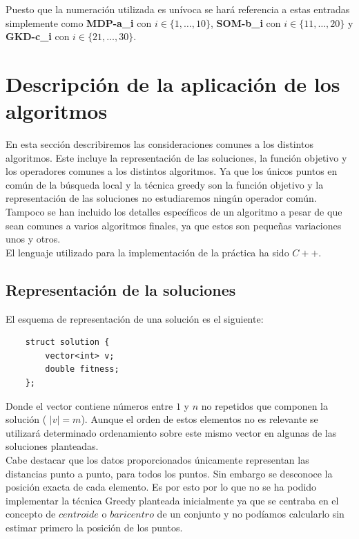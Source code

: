 \documentclass[11pt,a4paper]{article}
\begin{document}
	Puesto que la numeración utilizada es unívoca se hará referencia a estas entradas simplemente como \textbf{MDP-a\_i} con $i\in\{1,\dotsc,10\}$, \textbf{SOM-b\_i} con $i\in\{11,\dotsc,20\}$ y \textbf{GKD-c\_i} con $i\in\{21,\dotsc,30\}$.
	
	\section{Descripción de la aplicación de los algoritmos}
	
	En esta sección describiremos las consideraciones comunes a los distintos algoritmos. Este incluye la representación de las soluciones, la función objetivo y los operadores comunes a los distintos algoritmos. Ya que los únicos puntos en común de la búsqueda local y la técnica greedy son la función objetivo y la representación de las soluciones no estudiaremos ningún operador común. Tampoco se han incluido los detalles específicos de un algoritmo a pesar de que sean comunes a varios algoritmos finales, ya que estos son pequeñas variaciones unos y otros.  \\
	
	El lenguaje utilizado para la implementación de la práctica ha sido $C++$. 
	
	\subsection{Representación de la soluciones}
	
	El esquema de representación de una solución es el siguiente:

	\begin{lstlisting}
	struct solution {
		vector<int> v;
		double fitness;
	};
	\end{lstlisting}
	
	Donde el vector contiene números entre $1$ y $n$ no repetidos que componen la solución ( $|v| = m$). Aunque el orden de estos elementos no es relevante se utilizará determinado ordenamiento sobre este mismo vector en algunas de las soluciones planteadas. \\
	
	Cabe destacar que los datos proporcionados únicamente representan las distancias punto a punto, para todos los puntos. Sin embargo se desconoce la posición exacta de cada elemento. Es por esto por lo que no se ha podido implementar la técnica Greedy planteada inicialmente ya que se centraba en el concepto de $centroide$ o $baricentro$ de un conjunto y no podíamos calcularlo sin estimar primero la posición de los puntos. \\
	
\end{document}
